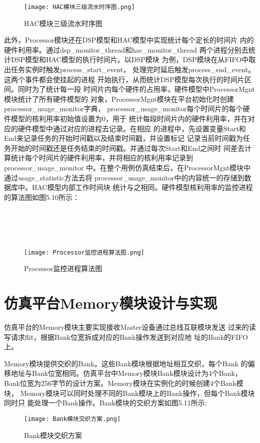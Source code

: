 \begin{figure}
    \centering
    \texttt{[image: HAC模块三级流水时序图.png]}
    \caption{HAC模块三级流水时序图}
    \label{fig:badge}
\end{figure}

此外，Processor模块还在DSP模型和HAC模型中实现统计每个定长的时间片
内的硬件利用率。通过dsp\_monitor\_thread和hac\_monitor\_thread
两个进程分别去统计DSP模型和HAC模型的执行时间片。以DSP模块
为例，DSP模块在从FIFO中取出任务实例时触发process\_start\_event，
处理完时延后触发process\_end\_event。这两个事件都会使挂起的进程
开始执行，从而统计DSP模型每次执行的时间片区间。同时为了统计每一段
时间片内每个硬件的占用率，硬件模型中ProcessorMgnt模块统计了所有硬件模型的
对象，ProcessorMgnt模块在平台初始化时创建processor\_usage\_monitor字典，
processor\_usage\_monitor每个时间片的每个硬件模型的核利用率初始值设置为0，用于
统计每段时间片内的硬件利用率，并在对应的硬件模型中通过对应的进程去记录。在相应
的进程中，先设置变量Start和End来记录任务的开始时间戳以及结束时间戳，并设置标记
记录当前时间戳为任务开始的时间戳还是任务结束的时间戳。并通过每次Start和End之间时
间差去计算统计每个时间片的硬件利用率，并将相应的核利用率记录到processor\_usage\_monitor
中。在整个用例仿真结束后，在ProcessorMgnt模块中通过usage\_statistic方法去将
processor\_usage\_monitor中的内容统一的存储到数据库中。HAC模型内部工作时间块
统计与之相同。硬件模型核利用率的监控进程的算法图如图5.10所示：
\\
\\
\\
\\
\\
\begin{figure}
    \centering
    \texttt{[image: Processor监控进程算法图.png]}
    \caption{Processor监控进程算法图}
    \label{fig:badge}
\end{figure}

\section{仿真平台Memory模块设计与实现}

仿真平台的Memory模块主要实现接收Master设备通过总线互联模块发送
过来的读写请求flit，根据Bank位宽拆成对应的Bank操作发送到对应地
址的Bank的FIFO上。

Memory模块提供交织的Bank。这些Bank模块根据地址相互交织，每个Bank
的偏移地址与Bank位宽相同。仿真平台中Memory模块Bank模块设计为4个Bank，
Bank位宽为256字节的设计方案。Memory模块在实例化的时候创建4个Bank模块，
Memory模块可以同时处理不同的Bank模块上的Bank操作，但每个Bank模块同时只
能处理一个Bank操作。Bank模块的交织方案如图5.11所示:
\begin{figure}
    \centering
    \texttt{[image: Bank模块交织方案.png]}
    \caption{Bank模块交织方案}
    \label{fig:badge}
\end{figure}


